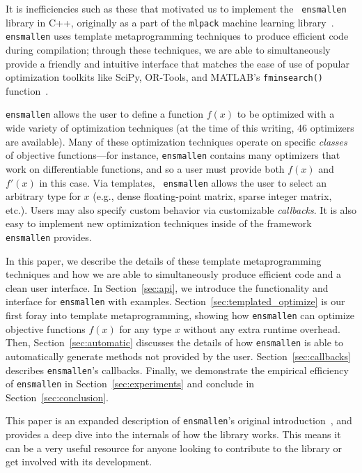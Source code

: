 It is inefficiencies such as these that motivated us to implement the {\tt
ensmallen} library in C++, originally as a part of the {\tt mlpack} machine
learning library~\cite{mlpack2018}.  {\tt ensmallen} uses template
metaprogramming techniques to produce efficient code during compilation; through
these techniques, we are able to simultaneously provide a friendly and intuitive
interface that matches the ease of use of popular optimization toolkits like
SciPy, OR-Tools, and MATLAB's {\tt fminsearch()}
function~\cite{matlab_fminsearch}.

{\tt ensmallen} allows the user to define a function $f(x)$ to be optimized with
a wide variety of optimization techniques (at the time of this writing, 46
optimizers are available).  Many of these optimization techniques operate on
specific {\it classes} of objective functions---for instance, {\tt ensmallen}
contains many optimizers that work on differentiable functions, and so a user
must provide both $f(x)$ and $f'(x)$ in this case.  Via templates, {\tt
ensmallen} allows the user to select an arbitrary type for $x$ (e.g., dense
floating-point matrix, sparse integer matrix, etc.).  Users may also specify
custom behavior via customizable {\it callbacks}.  It is also easy to implement
new optimization techniques inside of the framework {\tt ensmallen} provides.

In this paper, we describe the details of these template metaprogramming
techniques and how we are able to simultaneously produce efficient code and a
clean user interface.  In Section~\ref{sec:api}, we introduce the functionality
and interface for {\tt ensmallen} with examples.
Section~\ref{sec:templated_optimize} is our first foray into template
metaprogramming, showing how {\tt ensmallen} can optimize objective functions
$f(x)$ for any type $x$ without any extra runtime overhead.  Then,
Section~\ref{sec:automatic} discusses the details of how {\tt ensmallen} is able
to automatically generate methods not provided by the user.
Section~\ref{sec:callbacks} describes {\tt ensmallen}'s callbacks.
Finally, we demonstrate the empirical efficiency of {\tt ensmallen} in
Section~\ref{sec:experiments} and conclude in Section~\ref{sec:conclusion}.

This paper is an expanded description of {\tt ensmallen}'s original
introduction~\cite{ensmallen2018, curtin2017generic}, and provides a deep dive
into the internals of how the library works.  This means it can be a very useful
resource for anyone looking to contribute to the library or get involved with
its development.
